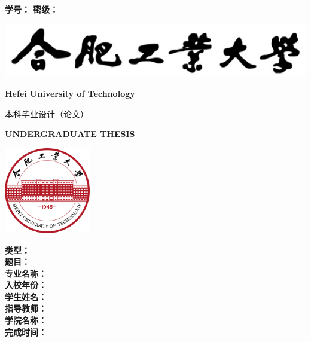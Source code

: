 \begin{titlepage}
    {
        \heiti \bfseries
        学\hspace{1.5em}号：\underlineFixlen[3.5cm]{\studentID} \hfill
        密\hspace{1.5em}级：\underlineFixlen[3.5cm]{\privacy}
    }

    \centering
    {\vspace{1.7cm} \includegraphics{img/hfut_name.png}\vspace{0.3cm}}

    {\LARGE \bfseries Hefei University of Technology}\vspace{0.7cm}

    {\chuhao \heiti 本科毕业设计（论文）}\vspace{0.5cm}

    {\LARGE \bfseries UNDERGRADUATE THESIS}\vspace{0.9cm}

    {\includegraphics[width=3.76cm, height=3.76cm]{img/hfut_logo.png}\vspace{0.5cm}}

    {
    \linespread{1.8}
    \songti \sanhao
    {\bfseries 类\hspace{2em}型：}\underlineFixlen[8.8cm]{\type}\\
    {\bfseries 题\hspace{2em}目：}\underlineFixlen[8.8cm]{\titleCn}\\
    {\bfseries 专业名称：}\underlineFixlen[8.8cm]{\major}\\
    {\bfseries 入校年份：}\underlineFixlen[8.8cm]{\enrolmentYear}\\
    {\bfseries 学生姓名：}\underlineFixlen[8.8cm]{\studentNameCn}\\
    {\bfseries 指导教师：}\underlineFixlen[8.8cm]{\supervisor}\\
    {\bfseries 学院名称：}\underlineFixlen[8.8cm]{\department}\\
    {\bfseries 完成时间：}\\
    }
\end{titlepage}
